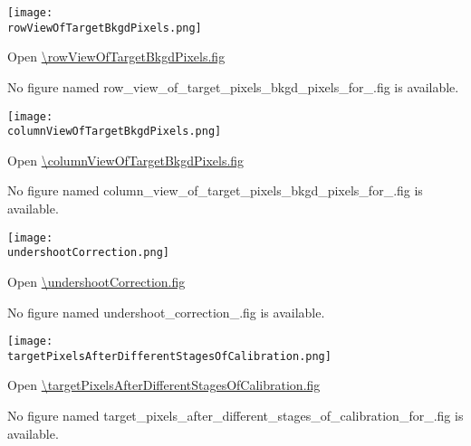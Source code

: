 \clearpage
\ifdefined \rowViewOfTargetBkgdPixels

\begin{center}
  \texttt{[image: \\rowViewOfTargetBkgdPixels.png]}
\end{center}

\rowViewOfTargetBkgdPixelsCaption

Open \url{\rowViewOfTargetBkgdPixels.fig}

\else
No figure named
row\_view\_of\_target\_pixels\_bkgd\_pixels\_for\_\channelSuffix.fig
is available.
\fi

\vspace{5ex}

\ifdefined \columnViewOfTargetBkgdPixels

\begin{center}
  \texttt{[image: \\columnViewOfTargetBkgdPixels.png]}
\end{center}

\columnViewOfTargetBkgdPixelsCaption

Open \url{\columnViewOfTargetBkgdPixels.fig}

\else
No figure named
column\_view\_of\_target\_pixels\_bkgd\_pixels\_for\_\channelSuffix.fig
is available.
\fi

\clearpage
\ifdefined \undershootCorrection

\begin{center}
  \texttt{[image: \\undershootCorrection.png]}
\end{center}

\undershootCorrectionCaption

Open \url{\undershootCorrection.fig}

\else
No figure named undershoot\_correction\_\channelSuffix.fig is
available.
\fi

\vspace{5ex}

\ifdefined \targetPixelsAfterDifferentStagesOfCalibration

\begin{center}
  \texttt{[image: \\targetPixelsAfterDifferentStagesOfCalibration.png]}
\end{center}

\targetPixelsAfterDifferentStagesOfCalibrationCaption

Open \url{\targetPixelsAfterDifferentStagesOfCalibration.fig}

\else
No figure named
target\_pixels\_after\_different\_stages\_of\_calibration\_for\_\channelSuffix.fig
is available.
\fi

